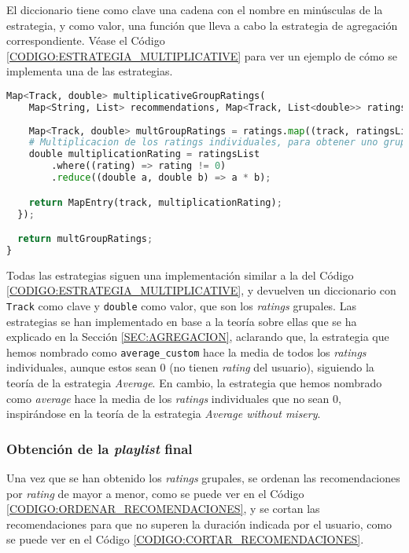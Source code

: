 El diccionario tiene como clave una cadena con el nombre en minúsculas de la estrategia, y como valor, 
una función que lleva a cabo la estrategia de agregación correspondiente. Véase el Código \ref{CODIGO:ESTRATEGIA_MULTIPLICATIVE} 
para ver un ejemplo de cómo se implementa una de las estrategias.

\begin{lstlisting}[language=python, caption=Estrategia de agregación \textit{average}, label=CODIGO:ESTRATEGIA_MULTIPLICATIVE]
Map<Track, double> multiplicativeGroupRatings(
    Map<String, List> recommendations, Map<Track, List<double>> ratings) {
  
    Map<Track, double> multGroupRatings = ratings.map((track, ratingsList) {
    # Multiplicacion de los ratings individuales, para obtener uno grupal
    double multiplicationRating = ratingsList
        .where((rating) => rating != 0)
        .reduce((double a, double b) => a * b);

    return MapEntry(track, multiplicationRating);
  });

  return multGroupRatings;
}
\end{lstlisting}

Todas las estrategias siguen una implementación similar a la del Código \ref{CODIGO:ESTRATEGIA_MULTIPLICATIVE},
y devuelven un diccionario con \texttt{Track} como clave y \texttt{double} como valor, que son los \textit{ratings} grupales.
Las estrategias se han implementado en base a la teoría sobre ellas que se ha explicado en la Sección \ref{SEC:AGREGACION}, 
aclarando que, la estrategia que hemos nombrado como \texttt{average\_custom} hace la media de todos los \textit{ratings} individuales,
aunque estos sean 0 (no tienen \textit{rating} del usuario), siguiendo la teoría de la estrategia \textit{Average}. En cambio, la estrategia que hemos 
nombrado como \textit{average} hace la media de los \textit{ratings} individuales que no sean 0, inspirándose en la teoría de la estrategia 
\textit{Average without misery}.

\subsubsection{Obtención de la \textit{playlist} final\label{subsec:playlist_final_implementacion}}

Una vez que se han obtenido los \textit{ratings} grupales, se ordenan las recomendaciones por \textit{rating} de mayor a menor, como 
se puede ver en el Código \ref{CODIGO:ORDENAR_RECOMENDACIONES}, y se cortan las recomendaciones para que no superen la duración 
indicada por el usuario, como se puede ver en el Código \ref{CODIGO:CORTAR_RECOMENDACIONES}.

